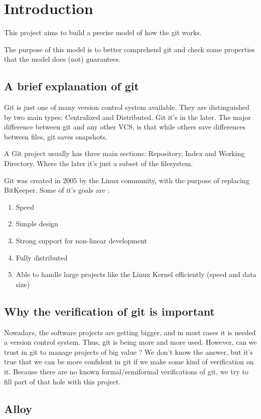 \section{Introduction}

This project aims to build a precise model of how the git works. \par
The purpose of this model is to better comprehend git and 
check some properties that the model does
(not) guarantees.\par

\subsection{A brief explanation of git}

Git is just one of many \Gls{version control system} available. 
They are 
distinguished by two main types: Centralized and Distributed.
Git it's in the later. The major difference between git and any
other VCS, is that while others save differences between files, git saves
snapshots. \par
A Git project usually has three main sections: Repository, Index and
Working Directory. Where the later it's just a subset of the filesystem. \par
Git was created in 2005 by the Linux community, 
with the purpose of replacing BitKeeper. Some of it's
goals are \cite{progit}: 

\begin{enumerate}
	\item Speed
	\item Simple design
	\item Strong support for non-linear development
	\item Fully distributed
	\item Able to handle large projects like the Linux Kernel 
	efficiently (speed and data size)
\end{enumerate}

\subsection{Why the verification of git is important}

Nowadays, the software projects are getting bigger, and in most
cases it is needed a version control system. Thus, git is being
more and more used. However, can we trust in git to manage projects
of big value ? We don't know the answer, but it's true that we can be
more confident in git if we make some kind of verification on it. Because
there are no known formal/semiformal verifications of git, we try to fill
part of that hole with this project.

\subsection{Alloy}
